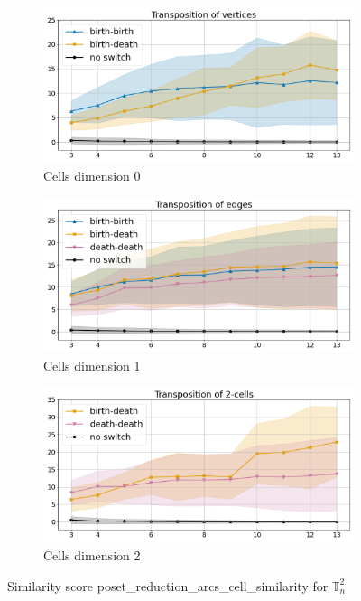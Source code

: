 \documentclass{article}
\begin{document}
\begin{figure}[htbp]
\centering
\begin{subfigure}[b]{0.3\textwidth}
    \includegraphics[width=\linewidth]{pics/torus-transpositions-extended/score-poset-reduction-arcs-cell-similarity-complex-dim2-transpositions-dim0.png}
    \caption{Cells dimension 0}
    \label{fig:posetreductionarcscellsimilaritycomplex2cells0}
\end{subfigure}
\hfill
\begin{subfigure}[b]{0.3\textwidth}
    \includegraphics[width=\linewidth]{pics/torus-transpositions-extended/score-poset-reduction-arcs-cell-similarity-complex-dim2-transpositions-dim1.png}
    \caption{Cells dimension 1}
    \label{fig:posetreductionarcscellsimilaritycomplex2cells1}
\end{subfigure}
\hfill
\begin{subfigure}[b]{0.3\textwidth}
    \includegraphics[width=\linewidth]{pics/torus-transpositions-extended/score-poset-reduction-arcs-cell-similarity-complex-dim2-transpositions-dim2.png}
    \caption{Cells dimension 2}
    \label{fig:posetreductionarcscellsimilaritycomplex2cells2}
\end{subfigure}
\caption{Similarity score poset\_reduction\_arcs\_cell\_similarity for $\mathbb{T}_n^{2}$}
\label{fig:posetreductionarcscellsimilaritycomplex2}
\end{figure}
\end{document}
